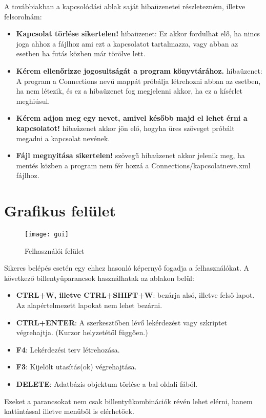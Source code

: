 A továbbiakban a kapcsolódási ablak saját hibaüzenetei részletezném, illetve felsorolnám:
\begin{itemize}
  \item \textbf{Kapcsolat törlése sikertelen!} hibaüzenet: Ez akkor fordulhat elő, ha nincs joga ahhoz a fájlhoz ami
  ezt a kapcsolatot tartalmazza, vagy abban az esetben ha futás közben már törölve lett.
  \item \textbf{Kérem ellenőrizze jogosultságát a program könyvtárához.} hibaüzenet: A program a Connections nevű mappát
  próbálja létrehozni abban az esetben, ha nem létezik, és ez a hibaüzenet fog megjelenni akkor, ha ez a kísérlet meghiúsul.
  \item \textbf{Kérem adjon meg egy nevet, amivel később majd el lehet érni a kapcsolatot!} hibaüzenet akkor jön elő, hogyha üres
  szöveget próbált megadni a kapcsolat nevének.
  \item \textbf{Fájl megnyitása sikertelen!} szövegű hibaüzenet akkor jelenik meg, ha mentés közben a program nem fér hozzá a
  Connections/kapcsolatneve.xml fájlhoz.
\end{itemize}

\section{Grafikus felület}
\begin{figure}[ht]
    \texttt{[image: gui]}
 \caption{Felhasználói felület}
\end{figure}
Sikeres belépés esetén egy ehhez hasonló képernyő fogadja a felhasználókat.
A következő billentyűparancsok használhatak az ablakon belül:
\begin{itemize}
  \item \textbf{CTRL+W, illetve CTRL+SHIFT+W}: bezárja alsó, illetve felső lapot. Az alapértelmezett lapokat nem lehet bezárni.
  \item \textbf{CTRL+ENTER}: A szerkesztőben lévő lekérdezést vagy szkriptet végrehajtja. (Kurzor helyzetétől függően.)
  \item \textbf{F4}: Lekérdezési terv létrehozása.
  \item \textbf{F3}: Kijelölt utasítás(ok) végrehajtása.
  \item \textbf{DELETE}: Adatbázis objektum törlése a bal oldali fából.
\end{itemize}

Ezeket a parancsokat nem csak billentyűkombinációk révén lehet elérni, hanem kattintással illetve menüből is elérhetőek.

